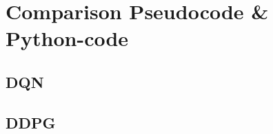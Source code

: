 

\chapter{Comparison Pseudocode \& Python-code} %

\label{AppendixA} %

\vspace{-0.8cm}

\section{DQN}



\begin{landscape}
	\begin{parcolumns}[distance=0.1em,colwidths={1=33em}]{2}
		\colchunk[1]{ }
		\colchunk[2]{  }
	\end{parcolumns}
\end{landscape}

\section{DDPG}




\begin{landscape}
	\begin{parcolumns}[distance=0.1em,colwidths={1=33em}]{2}
		\colchunk[1]{ }
		\colchunk[2]{  }
	\end{parcolumns}
\end{landscape}



